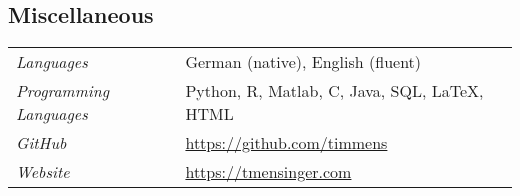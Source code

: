 \documentclass{article}
\begin{document}
\subsection*{Miscellaneous}

\begin{table}[h!]
\renewcommand{\arraystretch}{1.4}
    \begin{tabular}{p{110pt} p{350pt}}
         \textit{Languages} &  German (native), English (fluent)\\
         \textit{Programming Languages} & Python, \textsf{R}, Matlab, C, Java, SQL, \LaTeX, HTML\\
         \textit{GitHub} & \url{https://github.com/timmens}\\
         \textit{Website} & \url{https://tmensinger.com}
    \end{tabular}
  \end{table}


\end{document}
